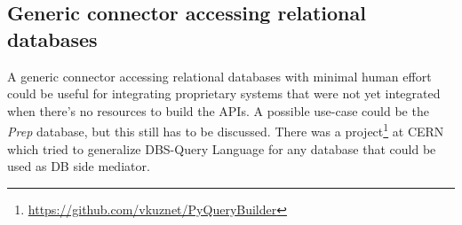 \subsection{\color{gray}Generic connector accessing relational databases}

{\color{gray}A generic connector accessing relational databases with minimal human effort could be useful for integrating proprietary systems that were not yet integrated when there's no resources to build the APIs. A possible use-case could be the \textit{Prep} database, but this still has to be discussed. 
%
There was a project\footnote{\url{https://github.com/vkuznet/PyQueryBuilder}}   at CERN which tried to generalize DBS-Query Language for any database that could be used as DB side mediator.
}
